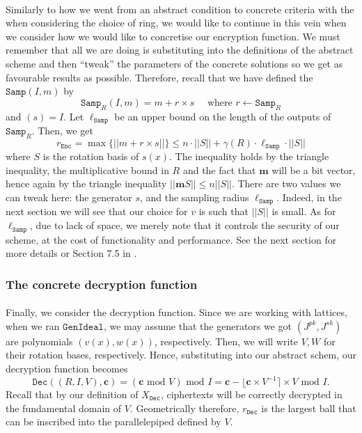 \documentclass{article}
\theoremstyle{definition}
\theoremstyle{example}
\newcommand{\Enc}{\texttt{Enc}}
\newcommand{\Dec}{\texttt{Dec}}
\renewcommand{\mod}{\,\,\text{mod}\,\,}
\newcommand{\GenIdeal}{\texttt{GenIdeal}}
\newcommand{\Samp}{\texttt{Samp}}
\renewcommand{\vec}[1]{\mathbf{#1}}
\newcommand{\norm}[1]{||#1||}
\begin{document}
\paragraph{} Similarly to how we went from an abstract condition to concrete
criteria with the when considering the choice of ring, we would like to continue
in this vein when we consider how we would like to concretise our encryption
function. We must remember that all we are doing is substituting into the
definitions of the abstract scheme and then ``tweak'' the parameters of the
concrete solutions so we get as favourable results as possible. Therefore,
recall that we have defined the $\Samp(I, m)$ by
\[
  \Samp_R(I, m) = m + r \times s\quad \text{ where } r \leftarrow \Samp_R
\]
and $(s) = I$. Let $\ell_\Samp$ be an upper bound on the length of the outputs
of $\Samp_R$. Then, we get
\[
  r_\Enc = \max\{\norm{m + r \times s}\} \leq n \cdot \norm{S} + \gamma(R)\cdot\ell_{\Samp}\cdot\norm{S}
\]
where $S$ is the rotation basis of $s(x)$. The inequality holds by the
triangle inequality, the multiplicative bound in $R$ and the fact that
$\vec{m}$ will be a bit vector, hence again by the triangle inequality
$\norm{\vec{m}S}\leq n\norm{S}$. There are two values we
can tweak here: the generator $s$, and the sampling radius $\ell_\Samp$. Indeed,
in the next section we will see that our choice for $v$ is such that $\norm{S}$
is small. As for $\ell_\Samp$, due to lack of space, we merely note that it
controls the security of our scheme, at the cost of functionality and
performance. See the next section for more details or Section 7.5 in \cite{gentry2009fully}.
\subsubsection{The concrete decryption function}
\paragraph{} Finally, we consider the decryption function. Since we are working
with lattices, when we ran $\GenIdeal$, we may assume that the generators we got
$(J^{pk}, J^{sk})$ are polynomials $(v(x), w(x))$, respectively. Then, we will
write $V, W$ for their rotation bases, respectively. Hence, substituting into
our abstract schem, our decryption function becomes
\[
  \Dec((R, I, V), \vec{c}) = (\vec{c} \mod V) \mod I = \vec{c} - \lfloor \vec{c}
  \times V^{-1} \rceil \times V \mod I.
\]
Recall that by our definition of $X_\Dec$, ciphertexts will be correctly
decrypted in the fundamental domain of $V$. Geometrically therefore, $r_\Dec$ is the largest ball
that can be inscribed into the parallelepiped defined by $V$.
\end{document}
